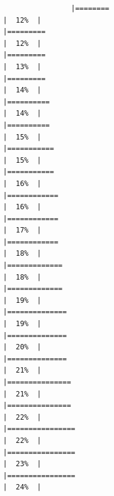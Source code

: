 \documentclass[
]{article}
\begin{document}
\begin{verbatim}
                |========                                                              |  12%  |                                                                              |=========                                                             |  12%  |                                                                              |=========                                                             |  13%  |                                                                              |=========                                                             |  14%  |                                                                              |==========                                                            |  14%  |                                                                              |==========                                                            |  15%  |                                                                              |===========                                                           |  15%  |                                                                              |===========                                                           |  16%  |                                                                              |============                                                          |  16%  |                                                                              |============                                                          |  17%  |                                                                              |============                                                          |  18%  |                                                                              |=============                                                         |  18%  |                                                                              |=============                                                         |  19%  |                                                                              |==============                                                        |  19%  |                                                                              |==============                                                        |  20%  |                                                                              |==============                                                        |  21%  |                                                                              |===============                                                       |  21%  |                                                                              |===============                                                       |  22%  |                                                                              |================                                                      |  22%  |                                                                              |================                                                      |  23%  |                                                                              |================                                                      |  24%  |                                                               
\end{verbatim}
\end{document}
